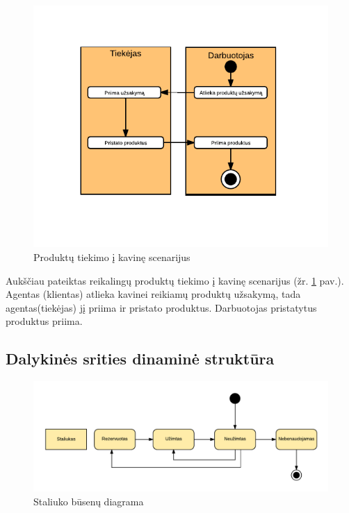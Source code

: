 \documentclass{VUMIFPSkursinis}
\begin{document}
	\begin {figure}[H]
	\centering
		\caption{Produktų tiekimo į kavinę scenarijus}
		\includegraphics[scale=1]{img/3lab/Diagrama6}
		
		\label{fig:diagrama6}
	\end{figure}
Aukščiau pateiktas reikalingų produktų tiekimo į kavinę scenarijus (žr. \ref{fig:diagrama6} pav.). Agentas (klientas) atlieka kavinei reikiamų produktų užsakymą, tada 
agentas(tiekėjas) jį priima ir pristato produktus. Darbuotojas pristatytus produktus priima. 
\pagebreak
\subsection{Dalykinės srities dinaminė struktūra}

	\begin {figure}[H]
	\centering
		\caption{Staliuko būsenų diagrama}
		\includegraphics[scale=0.9]{img/3lab/Diagrama7}
		
		\label{fig:diagrama7}
	\end{figure}
		
\end{document}
